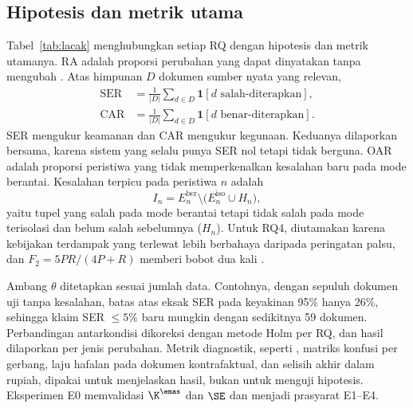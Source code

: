 \subsection{Hipotesis dan metrik utama}
Tabel~\ref{tab:lacak} menghubungkan setiap RQ dengan hipotesis dan metrik utamanya. RA adalah proporsi perubahan yang dapat dinyatakan tanpa mengubah . Atas himpunan $D$ dokumen sumber nyata yang relevan,
\begin{align}
\mathrm{SER} &= \tfrac{1}{|D|}\textstyle\sum_{d \in D} \mathbf{1}[d \text{ salah-diterapkan}], \label{eq:ser}\\
\mathrm{CAR} &= \tfrac{1}{|D|}\textstyle\sum_{d \in D} \mathbf{1}[d \text{ benar-diterapkan}]. \nonumber
\end{align}
SER mengukur keamanan dan CAR mengukur kegunaan. Keduanya dilaporkan bersama, karena sistem yang selalu  punya SER nol tetapi tidak berguna. OAR adalah proporsi peristiwa yang tidak memperkenalkan kesalahan baru pada mode berantai. Kesalahan terpicu pada peristiwa $n$ adalah
\begin{equation}
I_n = E^{\mathrm{ber}}_n \setminus \big(E^{\mathrm{iso}}_n \cup H_n\big),
\label{eq:terpicu}
\end{equation}
yaitu tupel yang salah pada mode berantai tetapi tidak salah pada mode terisolasi dan belum salah sebelumnya ($H_n$). Untuk RQ4,  diutamakan karena kebijakan terdampak yang terlewat lebih berbahaya daripada peringatan palsu, dan $F_2 = 5PR/(4P+R)$ memberi bobot  dua kali .

Ambang $\theta$ ditetapkan sesuai jumlah data. Contohnya, dengan sepuluh dokumen uji tanpa kesalahan, batas atas eksak SER pada keyakinan 95\% hanya 26\%, sehingga klaim SER $\leq 5\%$ baru mungkin dengan sedikitnya 59 dokumen. Perbandingan antarkondisi dikoreksi dengan metode Holm per RQ, dan hasil dilaporkan per jenis perubahan. Metrik diagnostik, seperti , matriks konfusi per gerbang, laju hafalan pada dokumen kontrafaktual, dan selisih akhir dalam rupiah, dipakai untuk menjelaskan hasil, bukan untuk menguji hipotesis. Eksperimen E0 memvalidasi $\K^{\emas}$ dan $\SE$ dan menjadi prasyarat E1--E4.
